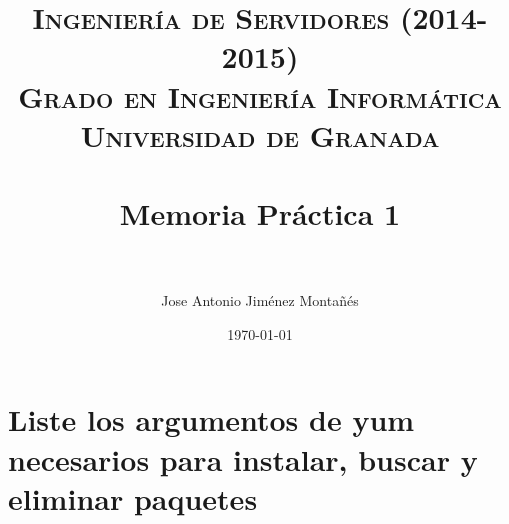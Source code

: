 

\usepackage[pdftex,colorlinks=true,linkcolor=negro,urlcolor=blue]{hyperref,xcolor}

\graphicspath{ {./imagenes/} }
\usepackage{subfig}
\hypersetup{citecolor=blue}

\title{	
\normalfont \normalsize 
\textsc{{\bf Ingeniería de Servidores (2014-2015)} \\ Grado en Ingeniería Informática \\ Universidad de Granada} \\ [25pt]
\horrule{0.5pt} \\[0.4cm] %
\huge Memoria Práctica 1 \\ %
\horrule{2pt} \\[0.5cm] %
}

\author{Jose Antonio Jiménez Montañés}

\date{\normalsize\today}

%





\maketitle %

\newpage %

\tableofcontents %
\clearpage
\listoffigures


\newpage


\section{Liste los argumentos de yum necesarios para instalar, buscar y eliminar paquetes \cite{01c01}}

